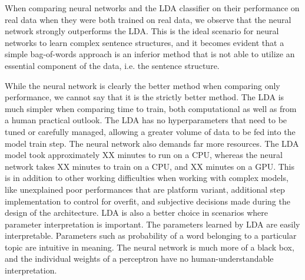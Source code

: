\documentclass[11pt]{article}
\begin{document}
When comparing neural networks and the LDA classifier on their performance on real data when they were both trained on real data, we observe that the neural network strongly outperforms the LDA. This is the ideal scenario for neural networks to learn complex sentence structures, and it becomes evident that a simple bag-of-words approach is an inferior method that is not able to utilize an essential component of the data, i.e. the sentence structure. 

While the neural network is clearly the better method when comparing only performance, we cannot say that it is the strictly better method. The LDA is much simpler when comparing time to train, both computational as well as from a human practical outlook. The LDA has no hyperparameters that need to be tuned or carefully managed, allowing a greater volume of data to be fed into the model train step. The neural network also demands far more resources. The LDA model took approximately XX minutes to run on a CPU, whereas the neural network takes XX minutes to train on a CPU, and XX minutes on a GPU. This is in addition to other working difficulties when working with complex models, like unexplained poor performances that are platform variant, additional step implementation to control for overfit, and subjective decisions made during the design of the architecture. LDA is also a better choice in scenarios where parameter interpretation is important. The parameters learned by LDA are easily interpretable. Parameters such as probability of a word belonging to a particular topic are intuitive in meaning. The neural network is much more of a black box, and the individual weights of a perceptron have no human-understandable interpretation. 

\end{document}
